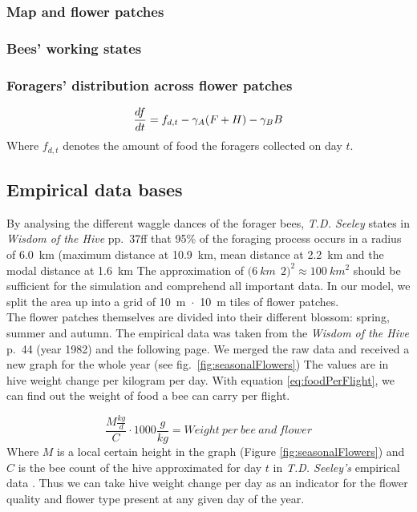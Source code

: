 		\subsubsection{Map and flower patches}
		
		\subsubsection{Bees' working states}
			\label{chap:beeWorkingStates}
			
		
		\subsubsection{Foragers' distribution across flower patches}
		\begin{equation}\label{eq:changeFoodStoreDyn}
			{df \over dt} = f_{d,t}- \gamma_A (F+H) - \gamma_B B
		\end{equation}
		Where $f_{d,t}$ denotes the amount of food the foragers collected on day $t$.
		
	\subsection{Empirical data bases}
		By analysing the different waggle dances of the forager bees, \textit{T.D. Seeley} states in \textit{Wisdom of the Hive} pp.~37ff that 95\% of the foraging process occurs in a radius of 6.0~km (maximum distance at 10.9~km, mean distance at 2.2~km and the modal distance at 1.6~km \cite{seeley95} The approximation of $(6~km~$\cdot$~2)^2 \approx 100~km^2$ should be sufficient for the simulation and comprehend all important data. In our model, we split the area up into a grid of 10~m~$\cdot$~10~m tiles of flower patches. \\
		The flower patches themselves are divided into their different blossom: spring, summer and autumn. The empirical data was taken from the \textit{Wisdom of the Hive} p.~44 (year 1982) and the following page. We merged the raw data and received a new graph for the whole year (see fig.~\ref{fig:seasonalFlowers}) The values are in hive weight change per kilogram per day. With equation \ref{eq:foodPerFlight}, we can find out the weight of food a bee can carry per flight.
		
		\begin{equation}\label{eq:foodPerFlight}
			\frac{M \frac{kg}{d}}{C}\cdot 1000 \frac{g}{kg} = Weight~per~bee~and~flower
		\end{equation}
		Where $M$ is a local certain height in the graph (Figure \ref{fig:seasonalFlowers}) and $C$ is the bee count of the hive approximated for day $t$ in \textit{T.D. Seeley's} empirical data \cite{seeley95}. Thus we can take hive weight change per day as an indicator for the flower quality and flower type present at any given day of the year. 
		
